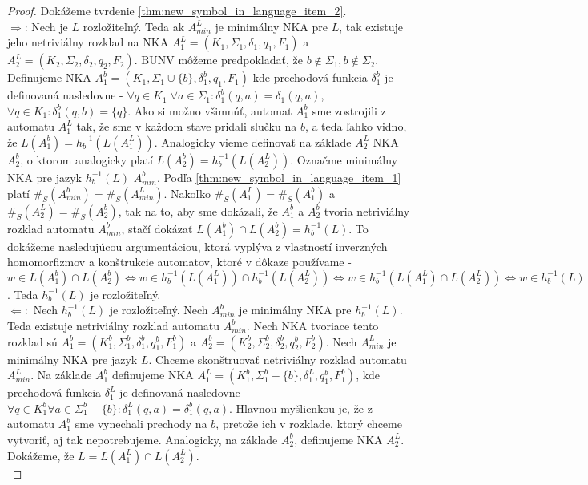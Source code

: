 \begin{proof}
\par
Dokážeme tvrdenie \ref{thm:new_symbol_in_language_item_2}. \\
$ \Rightarrow $: Nech je $ L $ rozložiteľný. Teda ak $ A_{min}^L $ je minimálny NKA pre $ L $, tak existuje jeho netriviálny rozklad na NKA $ A_1^{L}=(K_1, \Sigma_1, \delta_1, q_1, F_1) $ a $ A_2^{L}=(K_2, \Sigma_2, \delta_2, q_2, F_2) $. BUNV môžeme predpokladať, že $ b \notin \Sigma_1,b \notin \Sigma_2 $.  Definujeme NKA $ A_1^{b} = (K_1, \Sigma_1 \cup \lbrace b \rbrace, \delta_1^b, q_1, F_1) $ kde prechodová funkcia $ \delta_1^b $ je definovaná nasledovne - $ \forall q \in K_1 \; \forall a \in \Sigma_1: \delta_1^b(q,a)=\delta_1(q,a) $, $ \forall q \in K_1 : \delta_1^b(q,b) =  \lbrace q \rbrace$. Ako si možno všimnúť, automat $ A_1^{b} $ sme zostrojili z automatu $ A_1^L $ tak, že sme v každom stave pridali slučku na $ b $, a teda ľahko vidno, že $ L(A_1^{b}) = h_{b}^{-1}(L(A_1^L)) $. Analogicky vieme definovať na základe $ A_2^L $ NKA $ A_2^{b} $, o ktorom analogicky platí $ L(A_2^{b}) = h_{b}^{-1}(L(A_2^L)) $. Označme minimálny NKA pre jazyk $ h_b^{-1}(L) $ $ A_{min}^b $. Podľa \ref{thm:new_symbol_in_language_item_1} platí $ \#_S(A_{min}^b) = \#_S(A_{min}^L) $. Nakoľko $ \#_S(A_1^L) = \#_S(A_1^b) $ a $ \#_S(A_2^L) = \#_S(A_2^b) $, tak na to, aby sme dokázali, že $ A_1^b $ a $ A_2^b $ tvoria netriviálny rozklad automatu $ A_{min}^b $, stačí dokázať $ L(A_1^b) \cap L(A_2^b) = h_b^{-1}(L) $. To dokážeme nasledujúcou argumentáciou, ktorá vyplýva z vlastností inverzných homomorfizmov a konštrukcie automatov, ktoré v dôkaze používame - $ w \in L(A_1^b) \cap L(A_2^b) \Leftrightarrow w \in h_b^{-1}(L(A_1^L)) \cap h_b^{-1}(L(A_2^L)) \Leftrightarrow w \in h_b^{-1}(L(A_1^L) \cap L(A_2^L)) \Leftrightarrow w \in h_b^{-1}(L) $. Teda $ h_b^{-1}(L) $ je rozložiteľný. \\
$ \Leftarrow: $ Nech $ h_b^{-1}(L) $ je rozložiteľný. Nech $ A^b_{min} $ je minimálny NKA pre $ h_b^{-1}(L) $. Teda existuje netriviálny rozklad automatu $ A^b_{min} $. Nech NKA tvoriace tento rozklad sú $ A_1^b = (K_1^b,\Sigma_1^b,\delta_1^b,q_1^b,F_1^b) $ a $ A_2^b = (K_2^b,\Sigma_2^b,\delta_2^b,q_2^b,F_2^b) $. Nech $ A^L_{min} $ je minimálny NKA pre jazyk $ L $. Chceme skonštruovať netriviálny rozklad automatu $ A^L_{min} $. Na základe $ A_1^b $ definujeme NKA $ A_1^L = (K_1^b,\Sigma_1^b - \lbrace b \rbrace,\delta_1^L,q_1^b,F_1^b) $, kde prechodová funkcia $ \delta_1^L $ je definovaná nasledovne - $ \forall q \in K_1^b \forall a \in \Sigma_1^b - \lbrace b \rbrace : \delta_1^L(q,a) = \delta_1^b(q,a) $. Hlavnou myšlienkou je, že z automatu $ A_1^b $ sme vynechali prechody na $ b $, pretože ich v rozklade, ktorý chceme vytvoriť, aj tak nepotrebujeme. Analogicky, na základe $ A_2^b $, definujeme NKA $ A_2^L $. Dokážeme, že $ L = L(A_1^L) \cap L(A_2^L) $. \\

\end{proof}
